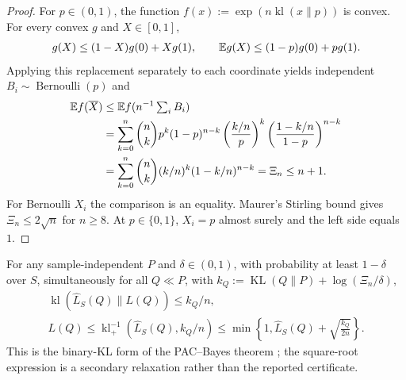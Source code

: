 \begin{proof}
For $p\in(0,1)$, the function $f(x):=\exp(n\operatorname{kl}(x\|p))$ is convex.
For every convex $g$ and $X\in[0,1]$,
\begin{gather}
 g(X)\le(1-X)g(0)+Xg(1),\qquad
 \mathbb E g(X)\le(1-p)g(0)+pg(1).
\end{gather}
Applying this replacement separately to each coordinate yields independent
$B_i\sim\operatorname{Bernoulli}(p)$ and
\begin{align}
 \mathbb E f(\overline X)
 &\le\mathbb E f(n^{-1}\textstyle\sum_iB_i)\\
 &=\sum_{k=0}^n\binom nk p^k(1-p)^{n-k}
             \left(\frac{k/n}{p}\right)^k
             \left(\frac{1-k/n}{1-p}\right)^{n-k}\\
 &=\sum_{k=0}^n\binom nk(k/n)^k(1-k/n)^{n-k}=\Xi_n\le n+1.
\end{align}
For Bernoulli $X_i$ the comparison is an equality. Maurer's Stirling bound
\citep[Theorem 1]{maurer2004note} gives $\Xi_n\le2\sqrt n$ for $n\ge8$.
At $p\in\{0,1\}$, $X_i=p$ almost surely and the left side equals $1$.
\end{proof}
\begin{theorem}
\label{thm:rigid-pac}
For any sample-independent $P$ and $\delta\in(0,1)$, with probability at least
$1-\delta$ over $S$, simultaneously for all $Q\ll P$, with
$k_Q:=\operatorname{KL}(Q\|P)+\log(\Xi_n/\delta)$,
\begin{gather}
 \operatorname{kl}(\widehat L_S(Q)\|L(Q))
 \le k_Q/n,\\
 L(Q)\le\operatorname{kl}_+^{-1}(\widehat L_S(Q),k_Q/n)
 \le\min\left\{1,\widehat L_S(Q)+\sqrt{\frac{k_Q}{2n}}\right\}.
\end{gather}
This is the binary-KL form of the PAC--Bayes theorem
\citep{seeger2002pac,maurer2004note}; the square-root expression is a secondary
relaxation rather than the reported certificate.
\end{theorem}
